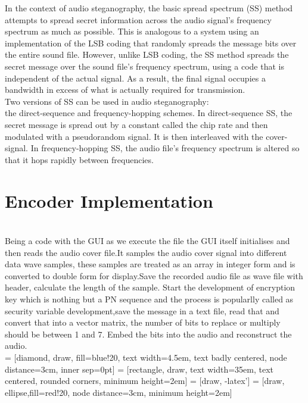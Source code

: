 \documentclass[a4paper, 12pt, notitlepage]{report}
\begin{document}
In  the  context  of  audio  steganography,  the  basic  spread spectrum  (SS)  method  attempts  to  spread  secret  information 
across  the  audio  signal's  frequency  spectrum  as  much  as possible.  This  is  analogous  to  a  system  using  an 
implementation  of  the  LSB  coding  that  randomly  spreads  the message  bits  over  the  entire  sound  file.  However,  unlike  LSB coding,  the  SS  method  spreads  the  secret  message  over  the sound  file's  frequency  spectrum,  using  a  code  that  is 
independent  of  the  actual  signal.  As  a  result,  the  final  signal occupies a bandwidth in excess of what is actually required for transmission.\\

Two  versions  of  SS  can  be  used  in  audio  steganography:\\ 
the direct-sequence and frequency-hopping schemes. In direct-sequence  SS,  the  secret  message  is  spread  out  by  a  constant 
called  the  chip  rate  and  then  modulated  with  a  pseudorandom signal. It is then interleaved with the cover-signal. In frequency-hopping  SS,  the  audio  file's  frequency  spectrum  is  altered  so that it hops rapidly between frequencies.\\

\section{Encoder Implementation}
\\
Being a code with the GUI as we execute the file the GUI itself initialises and then reads the audio cover file.It samples the audio cover signal into different data wave samples, these samples are treated as an array in integer form and is converted to double form for display.Save the recorded audio file as wave file with header, calculate the length of the sample. Start the development of encryption key which is nothing but a PN sequence and the process is popularlly called as security variable development,save the message in a text file, read that and convert that into a vector matrix, the number of bits to replace or multiply should be between 1 and 7. Embed the bits into the audio and reconstruct the audio.\\

 = [diamond, draw, fill=blue!20, 
    text width=4.5em, text badly centered, node distance=3cm, inner sep=0pt]
 = [rectangle, draw,
    text width=35em, text centered, rounded corners, minimum height=2em]
 = [draw, -latex']
 = [draw, ellipse,fill=red!20, node distance=3cm,
    minimum height=2em]
\end{document}
